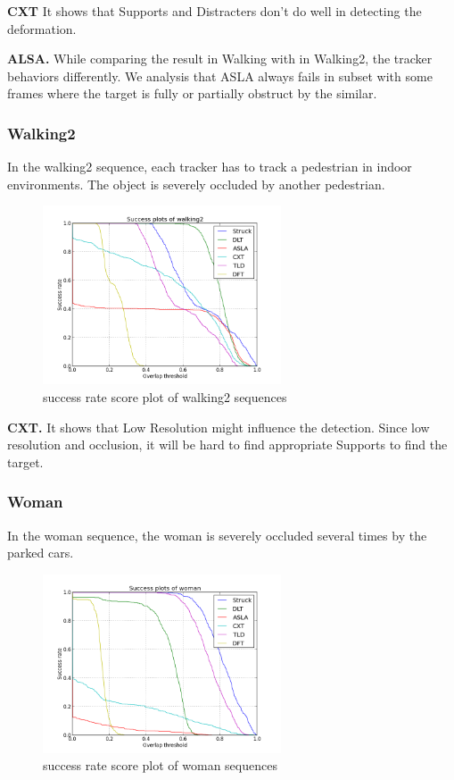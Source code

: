 \documentclass{acm_proc_article-sp}
\begin{document}
\textbf{CXT} It shows that Supports and Distracters don't do well in detecting the deformation.

\textbf{ALSA.} While comparing the result in Walking with in Walking2, the tracker behaviors differently. We analysis that ASLA always fails in subset with some frames where the target is fully or partially obstruct by the similar. 

\subsubsection{Walking2}

In the walking2 sequence, each tracker has to track a pedestrian in indoor environments. The object is severely occluded by another pedestrian.

\begin{figure}[hbt]
    \centering
    \includegraphics[width=200pt]{walking2}
    \caption{success rate score plot of walking2 sequences}
    \label{fig:walking2}
\end{figure}

\textbf{CXT.} It shows that Low Resolution might influence the detection. Since low resolution and occlusion, it will be hard to find appropriate Supports to find the target.

\subsubsection{Woman}

In the woman sequence, the woman is severely occluded several times by the parked cars.

\begin{figure}[hbt]
	\centering
	\includegraphics[width=200pt]{woman}
	\caption{success rate score plot of woman sequences}
	\label{fig:woman}
\end{figure}
\end{document}
